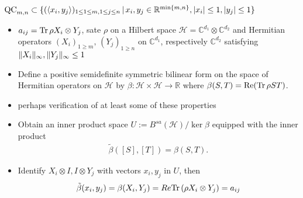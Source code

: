 \begin{frame}
\begin{block}{$ \textup{QC}_{m,n} \subset \{ (\langle x_i,y_j \rangle)_{1 \le 1 \le m, 1 \le j \le n} \,| \, x_i,y_j \in \mathbb{R}^{ \min \{m,n \} }, \vert x_i  \vert \le 1, \vert y_j \vert \le 1  \} $}
	\begin{itemize}
		\item $ a_{ij} = \text{Tr} \, {\rho X_i \otimes Y_j}  $, sate $ \rho $ on a Hilbert space $ \mathcal{H} = \mathbb{C}^{d_1} \otimes\mathbb{C}^{d_2} $ and Hermitian operators $ (X_i)_{1 \ge m}, \, (Y_j)_{1 \ge n} $ on $ \mathbb{C}^{d_1} $, respectively $ \mathbb{C}^{d_2} $ satisfying $  \Vert {X_i} \Vert_{\infty},  \Vert {Y_j} \Vert_{\infty} \le 1 $
		\item Define a positive semidefinite symmetric bilinear form on the space of Hermitian operators on $ \mathcal{H} $ by 
		$ \beta: \mathcal{H} \times \mathcal{H} \to \mathbb{R} $ where $ \beta(S,T) =\textup{Re}( \text{Tr} \, {\rho ST} ) $.
		\item perhaps verification of at least some of these properties 
		\item Obtain an inner product space $ U := B^{sa}(\mathcal{H}) / \ker \beta$ equipped with the inner product 
		\begin{align*}
			\tilde{\beta}([S],[T]) = \beta(S,T).
		\end{align*}
		\item Identify $ X_i \otimes I,I \otimes Y_j $ with vectors $ x_i,y_j $ in $ U $, then 
		\begin{align*}
			\tilde{\beta}(x_i,y_j) = \beta(X_i,Y_j) = Re \text{Tr} \, {(\rho X_i \otimes Y_j)}  = a_{ij}
		\end{align*}
	\end{itemize}
\end{block}
\end{frame}
